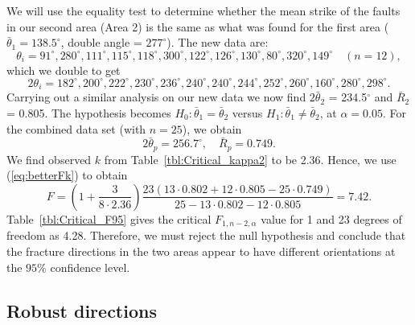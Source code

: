 \begin{example}
We will use the equality test to determine whether the mean
strike of the faults in our second area (Area 2) is the same as what was found for the first area
($\bar{\theta}_1 = 138.5^{\circ}$, double angle = $277^{\circ}$).  The new data are: 
$$
\theta_i = 91^{\circ}, 280^{\circ}, 111^{\circ}, 115^{\circ}, 118^{\circ}, 300^{\circ}, 122^{\circ}, 126^{\circ}, 130^{\circ}, 80^{\circ}, 320^{\circ}, 149^{\circ} \quad (n = 12),
$$
which we double to get
$$
2\theta_i = 182^{\circ}, 200^{\circ}, 222^{\circ}, 230^{\circ}, 236^{\circ}, 240^{\circ}, 240^{\circ}, 244^{\circ}, 252^{\circ}, 260^{\circ}, 160^{\circ}, 280^{\circ}, 298^{\circ}.
$$
Carrying out a similar analysis on our new data
we now find $2\bar{\theta}_2$ = 234.5$^{\circ}$ and $\bar{R}_2$ = 0.805. The hypothesis becomes 
$H_0:\bar{\theta}_1 = \bar{\theta}_2$ versus $H_1:\bar{\theta}_1 \neq \bar{\theta}_2$, at 
$\alpha = 0.05$.  For the combined data set (with $n = 25$), we obtain
\begin{equation}
2\bar{\theta}_p =256.7^{\circ}, \quad \bar{R}_p =0.749.
\end{equation}
We find observed $k$ from Table~\ref{tbl:Critical_kappa2} to be 2.36.  Hence, we use (\ref{eq:betterFk}) to obtain
\begin{equation}
F = \left(1 + \frac{3}{8 \cdot 2.36} \right) \frac{23 \left(13\cdot0.802 + 12\cdot0.805 - 25\cdot0.749 \right)}{ 25-13\cdot0.802-12\cdot0.805}=7.42.
\end{equation}	 
Table~\ref{tbl:Critical_F95} gives the critical $F_{1,n-2,\alpha}$ value for 1 and 23
degrees of freedom as 4.28.  Therefore, we must 
reject the null hypothesis and conclude that the fracture directions in the two areas appear to have
different orientations at the $95 \%$ confidence level.
\end{example}

\subsection{Robust directions}

